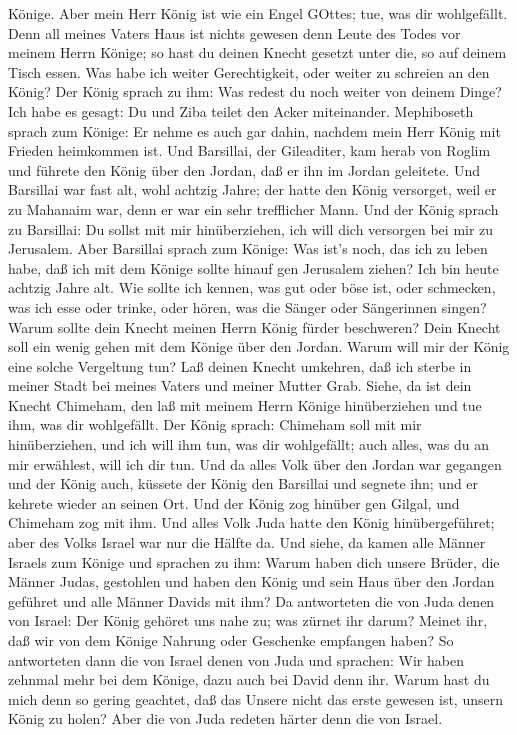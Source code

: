 Könige. Aber mein Herr König ist wie ein Engel GOttes; tue, was dir
wohlgefällt.  Denn all meines Vaters Haus ist nichts
gewesen denn Leute des Todes vor meinem Herrn Könige; so hast du deinen
Knecht gesetzt unter die, so auf deinem Tisch essen. Was habe ich weiter
Gerechtigkeit, oder weiter zu schreien an den König?  Der
König sprach zu ihm: Was redest du noch weiter von deinem Dinge? Ich
habe es gesagt: Du und Ziba teilet den Acker miteinander. 
Mephiboseth sprach zum Könige: Er nehme es auch gar dahin, nachdem mein
Herr König mit Frieden heimkommen ist.  Und Barsillai, der
Gileaditer, kam herab von Roglim und führete den König über den Jordan,
daß er ihn im Jordan geleitete.  Und Barsillai war fast
alt, wohl achtzig Jahre; der hatte den König versorget, weil er zu
Mahanaim war, denn er war ein sehr trefflicher Mann.  Und
der König sprach zu Barsillai: Du sollst mit mir hinüberziehen, ich will
dich versorgen bei mir zu Jerusalem.  Aber Barsillai sprach
zum Könige: Was ist's noch, das ich zu leben habe, daß ich mit dem
Könige sollte hinauf gen Jerusalem ziehen?  Ich bin heute
achtzig Jahre alt. Wie sollte ich kennen, was gut oder böse ist, oder
schmecken, was ich esse oder trinke, oder hören, was die Sänger oder
Sängerinnen singen? Warum sollte dein Knecht meinen Herrn König fürder
beschweren?  Dein Knecht soll ein wenig gehen mit dem
Könige über den Jordan. Warum will mir der König eine solche Vergeltung
tun?  Laß deinen Knecht umkehren, daß ich sterbe in meiner
Stadt bei meines Vaters und meiner Mutter Grab. Siehe, da ist dein
Knecht Chimeham, den laß mit meinem Herrn Könige hinüberziehen und tue
ihm, was dir wohlgefällt.  Der König sprach: Chimeham soll
mit mir hinüberziehen, und ich will ihm tun, was dir wohlgefällt; auch
alles, was du an mir erwählest, will ich dir tun.  Und da
alles Volk über den Jordan war gegangen und der König auch, küssete der
König den Barsillai und segnete ihn; und er kehrete wieder an seinen
Ort.  Und der König zog hinüber gen Gilgal, und Chimeham
zog mit ihm. Und alles Volk Juda hatte den König hinübergeführet; aber
des Volks Israel war nur die Hälfte da.  Und siehe, da
kamen alle Männer Israels zum Könige und sprachen zu ihm: Warum haben
dich unsere Brüder, die Männer Judas, gestohlen und haben den König und
sein Haus über den Jordan geführet und alle Männer Davids mit ihm?
 Da antworteten die von Juda denen von Israel: Der König
gehöret uns nahe zu; was zürnet ihr darum? Meinet ihr, daß wir von dem
Könige Nahrung oder Geschenke empfangen haben?  So
antworteten dann die von Israel denen von Juda und sprachen: Wir haben
zehnmal mehr bei dem Könige, dazu auch bei David denn ihr. Warum hast du
mich denn so gering geachtet, daß das Unsere nicht das erste gewesen
ist, unsern König zu holen? Aber die von Juda redeten härter denn die
von Israel.

